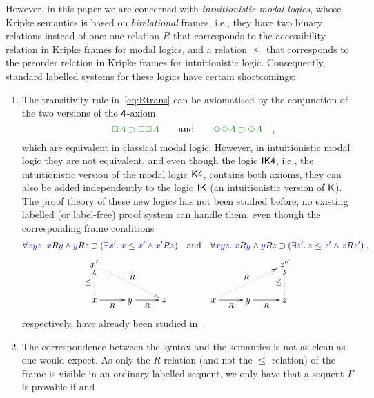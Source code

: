 However,
in this paper we are concerned with \emph{intuitionistic modal
  logics}, whose Kripke semantics is based on \emph{birelational}
frames, i.e., they have two binary relations instead of one: one
relation $R$ that corresponds to the accessibility relation in 
Kripke frames for modal logics, and a relation $\le$ that
corresponds to the preorder relation in Kripke frames for
intuitionistic logic. Consequently, standard labelled systems for
these logics have certain shortcomings:
\begin{enumerate}
\item The transitivity rule in~\eqref{eq:Rtrans} can be axiomatised by the conjunction of the two
  versions of the $\mathsf{4}$-axiom
  \begin{equation}
    \label{eq:4ax}
    \fm{\BOX A\IMP \BOX\BOX A}
    \qquand
    \fm{\DIA\DIA A\IMP\DIA A}
    \quadcm
  \end{equation}
  which are equivalent in classical
  modal logic. However, in intuitionistic modal logic they are not
  equivalent, and even though the logic $\mathsf{IK4}$, i.e., the
  intuitionistic version of the modal logic $\mathsf{K4}$, contains both
  axioms, they can also be added independently to the logic $\mathsf{IK}$ (an
  intuitionistic version of $\mathsf{K}$). The proof theory of these
  new logics has not been studied before; no existing labelled (or
  label-free) proof system can handle them, even though the
  corresponding frame conditions
  \begin{equation}
    \label{eq:4frame}
    \forall{\color{blue}{xyz}}.\:{\color{blue}{x}}R{\color{blue}{y}}\mathbin{\wedge} {\color{blue}{y}}R{\color{blue}{z}}\mathbin{\supset}(\exists{\color{blue}{x'}}.\:{\color{blue}{x}}\le{{\color{blue}{x'}}}\mathbin{\wedge}{\color{blue}{x'}}R{\color{blue}{z}})
    \quad\mbox{and}\quad
    \forall{\color{blue}{xyz}}.\:{\color{blue}{x}}R{\color{blue}{y}}\mathbin{\wedge} {\color{blue}{y}}R{\color{blue}{z}}\mathbin{\supset}(\exists{\color{blue}{z'}}.\:{\color{blue}{z}}\le{{\color{blue}{z'}}}\mathbin{\wedge}{\color{blue}{x}}R{\color{blue}{z'}})
    \;,
  \end{equation}
  $$
  \xymatrix{
  	x' \ar@{.>}[drr]^R \\
  	x \ar@{.>}[u]^\le \ar@{->}[r]_{R} & y \ar@{->}[r]_{R} & z
  }
  \qquad\qquad
  \xymatrix{
  	&& z''  \\
  	x  \ar@{.>}[urr]^R \ar@{->}[r]_{R} & y \ar@{->}[r]_{R} & z \ar@{.>}[u]^\le
  }
  $$
  respectively, have already been studied
  in~\cite{plotkin:stirling:86}.
  \item The correspondence between the syntax and the semantics is not
  as clean as one would expect. As only the $R$-relation (and not the
  $\le$-relation) of the frame is visible in an ordinary labelled
  sequent, we only have that a sequent $\Gamma$ is provable if and

\end{enumerate}
